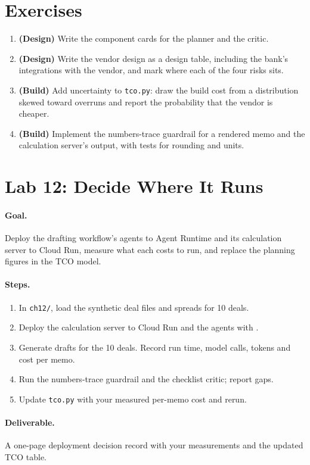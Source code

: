 \section*{Exercises}

\begin{enumerate}[itemsep=2pt]
  \item \textbf{(Design)} Write the component cards for the planner and the critic.
  \item \textbf{(Design)} Write the vendor design as a design table, including the bank's integrations with the vendor, and mark where each of the four risks sits.
  \item \textbf{(Build)} Add uncertainty to \texttt{tco.py}: draw the build cost from a distribution skewed toward overruns and report the probability that the vendor is cheaper.
  \item \textbf{(Build)} Implement the numbers-trace guardrail for a rendered memo and the calculation server's output, with tests for rounding and units.
\end{enumerate}

\section*{Lab 12: Decide Where It Runs}

\paragraph{Goal.} Deploy the drafting workflow's agents to Agent Runtime and its calculation server to Cloud Run, measure what each costs to run, and replace the planning figures in the TCO model.

\paragraph{Steps.}
\begin{enumerate}[itemsep=2pt]
  \item In \texttt{ch12/}, load the synthetic deal files and spreads for 10 deals.
  \item Deploy the calculation server to Cloud Run and the agents with .
  \item Generate drafts for the 10 deals. Record run time, model calls, tokens and cost per memo.
  \item Run the numbers-trace guardrail and the checklist critic; report gaps.
  \item Update \texttt{tco.py} with your measured per-memo cost and rerun.
\end{enumerate}

\paragraph{Deliverable.} A one-page deployment decision record with your measurements and the updated TCO table.
